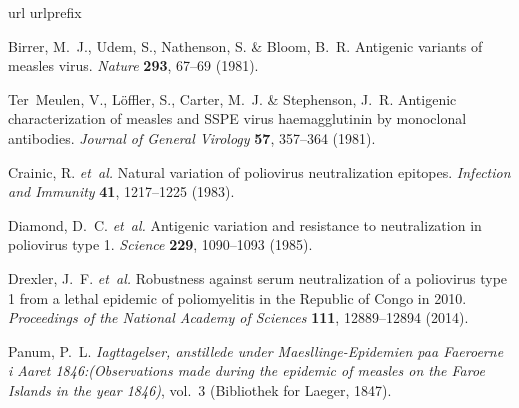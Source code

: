 \documentclass[11pt]{article}
\begin{document}

\begin{thebibliography}{10}
\expandafter\ifx\csname url\endcsname\relax
  \def\url#1{\texttt{#1}}\fi
\expandafter\ifx\csname urlprefix\endcsname\relax\def\urlprefix{URL }\fi
\providecommand{\bibinfo}[2]{#2}
\providecommand{\eprint}[2][]{\url{#2}}

\bibinfo{author}{Birrer, M.~J.}, \bibinfo{author}{Udem, S.},
  \bibinfo{author}{Nathenson, S.} \& \bibinfo{author}{Bloom, B.~R.}
\newblock \bibinfo{title}{Antigenic variants of measles virus}.
\newblock \emph{\bibinfo{journal}{Nature}} \textbf{\bibinfo{volume}{293}},
  \bibinfo{pages}{67--69} (\bibinfo{year}{1981}).

\bibinfo{author}{Ter~Meulen, V.}, \bibinfo{author}{L{\"o}ffler, S.},
  \bibinfo{author}{Carter, M.~J.} \& \bibinfo{author}{Stephenson, J.~R.}
\newblock \bibinfo{title}{Antigenic characterization of measles and {SSPE}
  virus haemagglutinin by monoclonal antibodies}.
\newblock \emph{\bibinfo{journal}{Journal of General Virology}}
  \textbf{\bibinfo{volume}{57}}, \bibinfo{pages}{357--364}
  (\bibinfo{year}{1981}).

\bibinfo{author}{Crainic, R.} \emph{et~al.}
\newblock \bibinfo{title}{Natural variation of poliovirus neutralization
  epitopes.}
\newblock \emph{\bibinfo{journal}{Infection and Immunity}}
  \textbf{\bibinfo{volume}{41}}, \bibinfo{pages}{1217--1225}
  (\bibinfo{year}{1983}).

\bibinfo{author}{Diamond, D.~C.} \emph{et~al.}
\newblock \bibinfo{title}{Antigenic variation and resistance to neutralization
  in poliovirus type 1}.
\newblock \emph{\bibinfo{journal}{Science}} \textbf{\bibinfo{volume}{229}},
  \bibinfo{pages}{1090--1093} (\bibinfo{year}{1985}).

\bibinfo{author}{Drexler, J.~F.} \emph{et~al.}
\newblock \bibinfo{title}{Robustness against serum neutralization of a
  poliovirus type 1 from a lethal epidemic of poliomyelitis in the {Republic of
  Congo} in 2010}.
\newblock \emph{\bibinfo{journal}{Proceedings of the National Academy of
  Sciences}} \textbf{\bibinfo{volume}{111}}, \bibinfo{pages}{12889--12894}
  (\bibinfo{year}{2014}).

\bibinfo{author}{Panum, P.~L.}
\newblock \emph{\bibinfo{title}{Iagttagelser, anstillede under
  Maesllinge-Epidemien paa Faeroerne i Aaret 1846:(Observations made during the
  epidemic of measles on the Faroe Islands in the year 1846)}},
  vol.~\bibinfo{volume}{3} (\bibinfo{publisher}{Bibliothek for Laeger},
  \bibinfo{year}{1847}).


\end{thebibliography}
\end{document}
